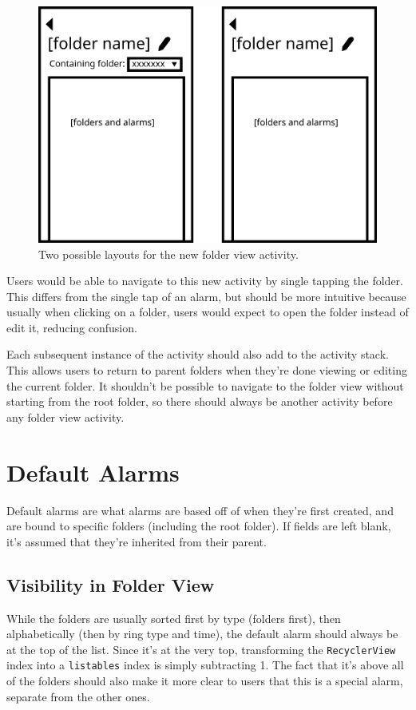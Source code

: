\documentclass[11pt]{article} %
\begin{document}
\begin{figure}[h]
	\centering
	\includegraphics[scale=0.5]{possible folder view layout.png}
	\caption{Two possible layouts for the new folder view activity.}
\end{figure}

Users would be able to navigate to this new activity by single tapping the folder. This differs from the single tap of an alarm, but should be more intuitive because usually when clicking on a folder, users would expect to open the folder instead of edit it, reducing confusion. 

Each subsequent instance of the activity should also add to the activity stack. This allows users to return to parent folders when they're done viewing or editing the current folder. It shouldn't be possible to navigate to the folder view without starting from the root folder, so there should always be another activity before any folder view activity. 

\section{Default Alarms}
Default alarms are what alarms are based off of when they're first created, and are bound to specific folders (including the root folder). If fields are left blank, it's assumed that they're inherited from their parent.

\subsection{Visibility in Folder View}
While the folders are usually sorted first by type (folders first), then alphabetically (then by ring type and time), the default alarm should always be at the top of the list. Since it's at the very top, transforming the \verb|RecyclerView| index into a \verb|listables| index is simply subtracting 1. The fact that it's above all of the folders should also make it more clear to users that this is a special alarm, separate from the other ones. 
\end{document}

